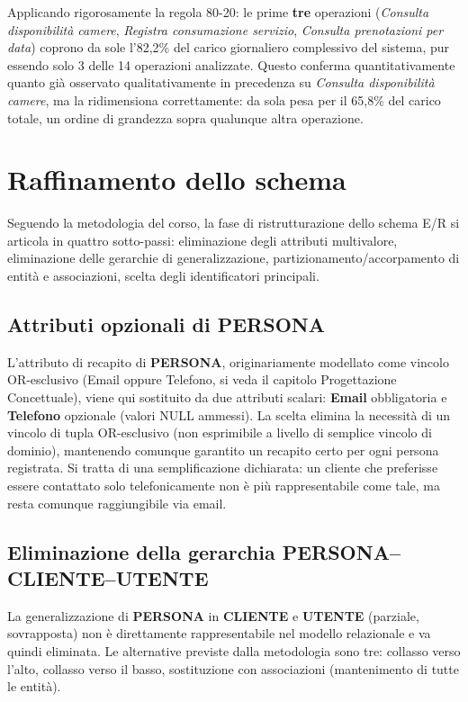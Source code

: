 \documentclass[a4paper,12pt]{report}
\begin{document}
Applicando rigorosamente la regola 80-20: le prime \textbf{tre}
operazioni (\textit{Consulta disponibilità camere},
\textit{Registra consumazione servizio}, \textit{Consulta prenotazioni
    per data}) coprono da sole l'82,2\% del carico giornaliero complessivo del
sistema, pur essendo solo 3 delle 14 operazioni analizzate. Questo
conferma quantitativamente quanto già osservato qualitativamente in
precedenza su \textit{Consulta disponibilità camere}, ma la ridimensiona
correttamente: da sola pesa per il 65,8\% del carico totale, un ordine di
grandezza sopra qualunque altra operazione.

\newpage

\section{Raffinamento dello schema}
\label{sec:RaffinamentoSchema}

Seguendo la metodologia del corso, la fase di ristrutturazione dello
schema E/R si articola in quattro sotto-passi: eliminazione degli
attributi multivalore, eliminazione delle gerarchie di generalizzazione,
partizionamento/accorpamento di entità e associazioni, scelta degli
identificatori principali.

\subsection{Attributi opzionali di PERSONA}

L'attributo di recapito di \textbf{PERSONA}, originariamente modellato
come vincolo OR-esclusivo (Email oppure Telefono, si veda il capitolo
Progettazione Concettuale), viene qui sostituito da due attributi
scalari: \textbf{Email} obbligatoria e \textbf{Telefono} opzionale
(valori NULL ammessi). La scelta elimina la necessità di un vincolo di
tupla OR-esclusivo (non esprimibile a livello di semplice vincolo di
dominio), mantenendo comunque garantito un recapito certo per ogni
persona registrata. Si tratta di una semplificazione dichiarata: un cliente che preferisse essere contattato solo
telefonicamente non è più rappresentabile come tale, ma resta comunque
raggiungibile via email.

\subsection{Eliminazione della gerarchia PERSONA--CLIENTE--UTENTE}

La generalizzazione di \textbf{PERSONA} in \textbf{CLIENTE} e
\textbf{UTENTE} (parziale, sovrapposta) non è direttamente rappresentabile
nel modello relazionale e va quindi eliminata. Le alternative previste
dalla metodologia sono tre: collasso verso l'alto, collasso verso il
basso, sostituzione con associazioni (mantenimento di tutte le entità).
\end{document}
